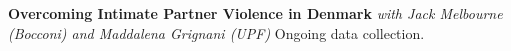 \documentclass[10pt,a4paper]{article}
\begin{document}
\textbf{Overcoming Intimate Partner Violence in Denmark}
\newline
\emph{with Jack Melbourne (Bocconi) and Maddalena Grignani (UPF)}
\newline
Ongoing data collection.


\begin{comment}
\section*{Other Interests}
\textbf{Local Election Predictions - A Machine Learning Approach}
\newline
\href{https://www.wahlorakel.com/}{Project website (in German)} \\
We explore the potential for machine learning algorithms to predict local election outcomes. In order to do so, we collect micro-level data on candidates from several sources. We use different prediction algorithms including neural networks to train estimators based on past election results. Then, we apply these estimator to the current candidate lists to predict results of upcoming elections. So far, we publicly covered three local elections in Bavaria (March 2020), North Rhine-Westphalia (September 2020), Hesse (March 2021), and one mayoral election in Stuttgart (November 2020).
\end{comment}
\end{document}
